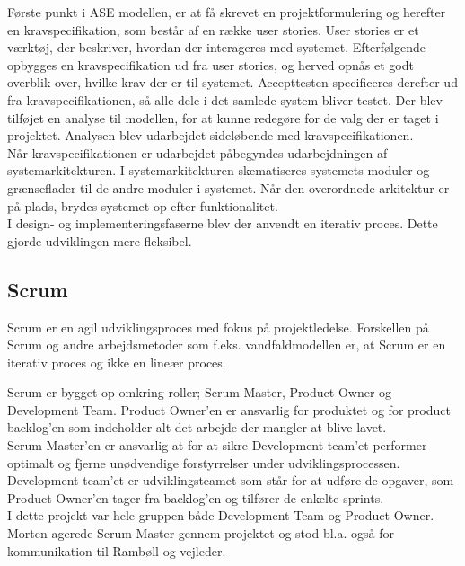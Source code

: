 Første punkt i ASE modellen, er at få skrevet en projektformulering og herefter en kravspecifikation, som består af en række user stories. User stories er et værktøj, der beskriver, hvordan der interageres med systemet. Efterfølgende opbygges en kravspecifikation ud fra user stories, og herved opnås et godt overblik over, hvilke krav der er til systemet. Accepttesten specificeres derefter ud fra kravspecifikationen, så alle dele i det samlede system bliver testet.
Der blev tilføjet en analyse til modellen, for at kunne redegøre for de valg der er taget i projektet. Analysen blev udarbejdet sideløbende med kravspecifikationen. \\
Når kravspecifikationen er udarbejdet påbegyndes udarbejdningen af systemarkitekturen. I systemarkitekturen skematiseres systemets moduler og grænseflader til de andre moduler i systemet. Når den overordnede arkitektur er på plads, brydes systemet op efter funktionalitet. \\
I design- og implementeringsfaserne blev der anvendt en iterativ proces. Dette gjorde udviklingen mere fleksibel. \\

\subsection{Scrum}
Scrum \cite{Scrum} er en agil udviklingsproces med fokus på projektledelse. Forskellen på Scrum og andre arbejdsmetoder som f.eks. vandfaldmodellen\cite{Vandfald} er, at Scrum er en iterativ proces og ikke en lineær proces.

Scrum er bygget op omkring roller; Scrum Master, Product Owner og Development Team. Product Owner'en er ansvarlig for produktet og for product backlog'en som indeholder alt det arbejde der mangler at blive lavet\cite{Scrum}. \\
Scrum Master'en er ansvarlig at for at sikre Development team'et performer optimalt og fjerne unødvendige forstyrrelser under udviklingsprocessen. \\
Development team'et er udviklingsteamet som står for at udføre de opgaver, som Product Owner'en tager fra backlog'en og tilfører de enkelte sprints. \\
I dette projekt var hele gruppen både Development Team og Product Owner. Morten agerede Scrum Master gennem projektet og stod bl.a. også for kommunikation til Rambøll og vejleder. \\



